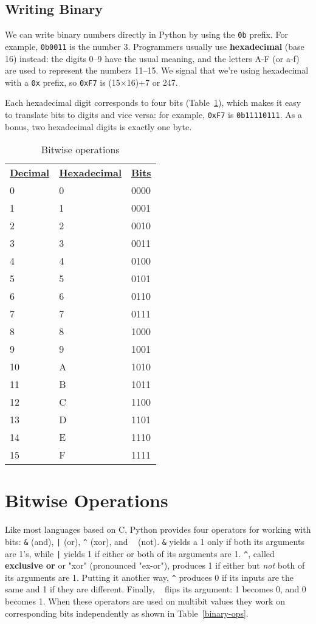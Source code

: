 \documentclass{scrbook}
\newcommand{\tblref}[1]{Table~\ref{#1}}
\newcommand{\glossref}[1]{\textbf{#1}}
\begin{document}
\subsection*{Writing Binary}


We can write binary numbers directly in Python by using the \texttt{0b} prefix.
For example, \texttt{0b0011} is the number 3.
Programmers usually use \glossref{hexadecimal} (base 16) instead:
the digits 0–9 have the usual meaning,
and the letters A-F (or a-f) are used to represent the numbers 11–15.
We signal that we're using hexadecimal with a \texttt{0x} prefix,
so \texttt{0xF7} is (15×16)+7 or 247.


Each hexadecimal digit corresponds to four bits (\tblref{binary-hex}),
which makes it easy to translate bits to digits and vice versa:
for example,
\texttt{0xF7} is \texttt{0b11110111}.
As a bonus,
two hexadecimal digits is exactly one byte.

\begin{table}
\begin{tabular}{lll}
\textbf{\underline{Decimal}} & \textbf{\underline{Hexadecimal}} & \textbf{\underline{Bits}} \\
0 & 0 & 0000 \\
1 & 1 & 0001 \\
2 & 2 & 0010 \\
3 & 3 & 0011 \\
4 & 4 & 0100 \\
5 & 5 & 0101 \\
6 & 6 & 0110 \\
7 & 7 & 0111 \\
8 & 8 & 1000 \\
9 & 9 & 1001 \\
10 & A & 1010 \\
11 & B & 1011 \\
12 & C & 1100 \\
13 & D & 1101 \\
14 & E & 1110 \\
15 & F & 1111 \\
\end{tabular}
\caption{Bitwise operations}
\label{binary-hex}
\end{table}


\section{Bitwise Operations}\label{binary-bitops}


Like most languages based on C,
Python provides four operators for working with bits:
\texttt{\&} (and),
\texttt{|} (or),
\texttt{{\textasciicircum}} (xor),
and \texttt{~} (not).
\texttt{\&} yields a 1 only if both its arguments are 1's,
while \texttt{|} yields 1 if either or both of its arguments are 1.
\texttt{{\textasciicircum}}, called \glossref{exclusive or} or "xor" (pronounced "ex-or"),
produces 1 if either but \emph{not} both of its arguments are 1.
Putting it another way,
\texttt{{\textasciicircum}} produces 0 if its inputs are the same and 1 if they are different.
Finally,
\texttt{~} flips its argument: 1 becomes 0, and 0 becomes 1.
When these operators are used on multibit values
they work on corresponding bits independently as shown in \tblref{binary-ops}.
\end{document}
